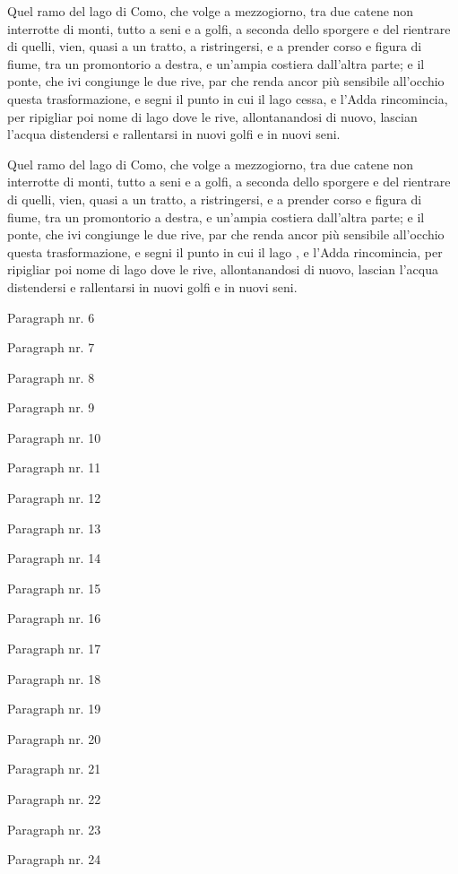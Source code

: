 \documentclass[b5paper]{book}
\begin{document}
\pausenumbering
\begin{pairs}
\begin{Leftside}
\resumenumbering
\numberpstartfalse
	\pstart
	Quel ramo del lago di Como, che volge a mezzogiorno, tra due catene non interrotte di monti, tutto a seni e a golfi, a seconda dello sporgere e del rientrare di quelli, vien, quasi a un tratto, a ristringersi, e a prender corso e figura di fiume, tra un promontorio a destra, e un'ampia costiera dall'altra parte; e il ponte, che ivi congiunge le due rive, par che renda ancor più sensibile all'occhio questa trasformazione, e segni il punto in cui il lago cessa, e l'Adda rincomincia, per ripigliar poi nome di lago dove le rive, allontanandosi di nuovo, lascian l'acqua distendersi e rallentarsi in nuovi golfi e in nuovi seni.
	\pend
\pausenumbering
\end{Leftside}

\begin{Rightside}
\resumenumbering
\numberpstartfalse
	\pstart
	Quel ramo del lago di Como, che volge a mezzogiorno, tra due catene non interrotte di monti, tutto a seni e a golfi, a seconda dello sporgere e del rientrare di quelli, vien, quasi a un tratto, a ristringersi, e a prender corso e figura di fiume, tra un promontorio a destra, e un'ampia costiera dall'altra parte; e il ponte, che ivi congiunge le due rive, par che renda ancor più sensibile all'occhio questa trasformazione, e segni il punto in cui il lago , e l'Adda rincomincia, per ripigliar poi nome di lago dove le rive, allontanandosi di nuovo, lascian l'acqua distendersi e rallentarsi in nuovi golfi e in nuovi seni.
	\pend
\pausenumbering
\end{Rightside}
\end{pairs}
\Columns
		
\resumenumbering
\numberpstarttrue
\pstart%
	Paragraph nr. 6%
\pend

\pstart%
	Paragraph nr. 7%
\pend

\pstart%
	Paragraph nr. 8%
\pend

\pstart%
	Paragraph nr. 9%
\pend

\pstart%
	Paragraph nr. 10%
\pend

\pstart%
	Paragraph nr. 11%
\pend

\pstart%
	Paragraph nr. 12%
\pend

\pstart%
	Paragraph nr. 13%
\pend

\pstart%
	Paragraph nr. 14%
\pend

\pstart%
	Paragraph nr. 15%
\pend

\pstart%
	Paragraph nr. 16%
\pend

\pstart%
	Paragraph nr. 17%
\pend

\pstart%
	Paragraph nr. 18%
\pend

\pstart%
	Paragraph nr. 19%
\pend

\pstart%
	Paragraph nr. 20%
\pend

\pstart%
	Paragraph nr. 21%
\pend

\pstart%
	Paragraph nr. 22%
\pend

\pstart%
	Paragraph nr. 23%
\pend

\pstart%
	Paragraph nr. 24%
\pend
\endnumbering
\end{document}
